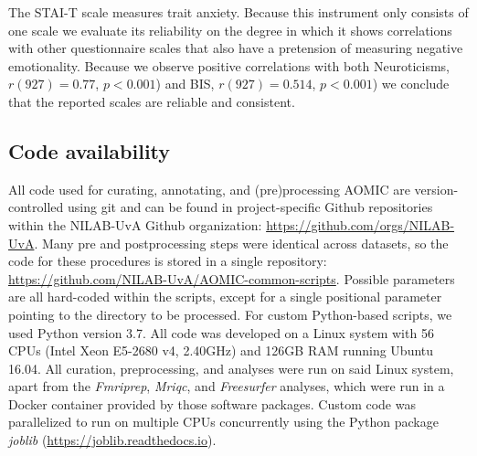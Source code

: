 \documentclass[11pt,american,a4paper,oneside,]{memoir} %
\begin{document}
The STAI-T scale measures trait anxiety. Because this instrument only consists of one scale we evaluate its reliability on the degree in which it shows correlations with other questionnaire scales that also have a pretension of measuring negative emotionality. Because we observe positive correlations with both Neuroticisms, \(r(927) = 0.77\), \(p < 0.001\)) and BIS, \(r(927) = 0.514\), \(p < 0.001\)) we conclude that the reported scales are reliable and consistent.

\hypertarget{aomic-code-availability}{%
\subsection{Code availability}\label{aomic-code-availability}}

All code used for curating, annotating, and (pre)processing AOMIC are version-controlled using git and can be found in project-specific Github repositories within the NILAB-UvA Github organization: \url{https://github.com/orgs/NILAB-UvA}. Many pre and postprocessing steps were identical across datasets, so the code for these procedures is stored in a single repository: \url{https://github.com/NILAB-UvA/AOMIC-common-scripts}. Possible parameters are all hard-coded within the scripts, except for a single positional parameter pointing to the directory to be processed. For custom Python-based scripts, we used Python version 3.7. All code was developed on a Linux system with 56 CPUs (Intel Xeon E5-2680 v4, 2.40GHz) and 126GB RAM running Ubuntu 16.04. All curation, preprocessing, and analyses were run on said Linux system, apart from the \emph{Fmriprep}, \emph{Mriqc}, and \emph{Freesurfer} analyses, which were run in a Docker container provided by those software packages. Custom code was parallelized to run on multiple CPUs concurrently using the Python package \emph{joblib} (\url{https://joblib.readthedocs.io}).
\end{document}
